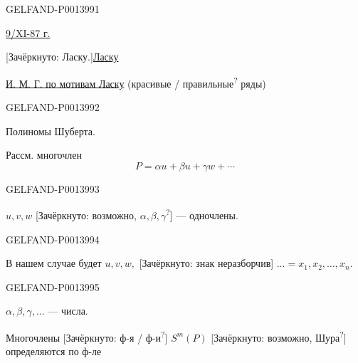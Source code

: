 \begin{GelfandAdjacentEvidence}{GELFAND-P001399}{1}

\uline{9/XI-87 г.}\qquad {}

[Зачёркнуто: Ласку.]\qquad \uline{Ласку}

\uline{И. М. Г. по мотивам Ласку}
(красивые / правильные\textsuperscript{?} ряды)

\end{GelfandAdjacentEvidence}
\begin{GelfandAdjacentEvidence}{GELFAND-P001399}{2}



Полиномы Шуберта.

Рассм. многочлен
\begin{equation*}
P=\alpha u+\beta u+\gamma w+\cdots \tag{1}
\end{equation*}
\end{GelfandAdjacentEvidence}
\begin{GelfandAdjacentEvidence}{GELFAND-P001399}{3}


\(u,v,w\) [Зачёркнуто: возможно, \(\alpha,\beta,\gamma\)\textsuperscript{?}] — одночлены.

\end{GelfandAdjacentEvidence}
\begin{GelfandAdjacentEvidence}{GELFAND-P001399}{4}



В нашем случае будет \(u,v,w,\)
[Зачёркнуто: знак неразборчив]
\(\ldots=x_1,x_2,\ldots,x_n\).

\end{GelfandAdjacentEvidence}
\begin{GelfandAdjacentEvidence}{GELFAND-P001399}{5}



\(\alpha,\beta,\gamma,\ldots\) — числа.

Многочлены [Зачёркнуто: ф-я / ф-и\textsuperscript{?}]
\(S^m(P)\) [Зачёркнуто: возможно, Шура\textsuperscript{?}]
определяются по ф-ле


\end{GelfandAdjacentEvidence}
